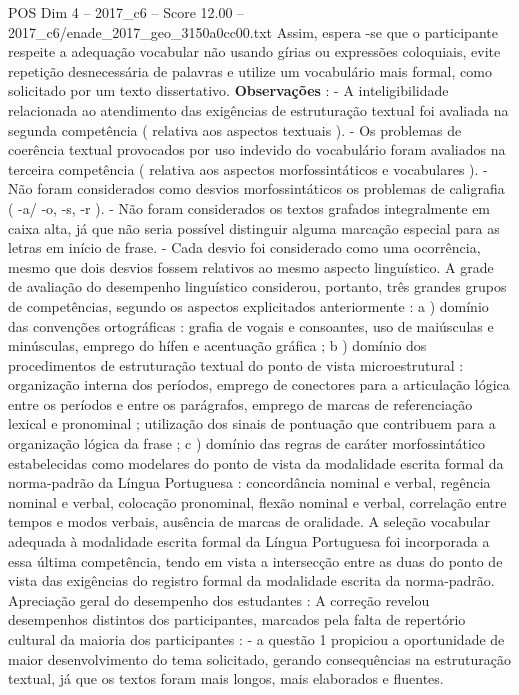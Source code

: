 \begin{textsample}{POS Dim 4 – 2017\_c6 – Score 12.00 – 2017\_c6/enade\_2017\_geo\_3150a0cc00.txt}
Assim, espera -se que o participante respeite a adequação vocabular não usando gírias ou expressões coloquiais, evite repetição desnecessária de palavras e utilize um vocabulário mais formal, como solicitado por um texto dissertativo. \textbf{Observações} : - A inteligibilidade relacionada ao atendimento das exigências de estruturação textual foi avaliada na segunda competência ( relativa aos aspectos textuais ). - Os problemas de coerência textual provocados por uso indevido do vocabulário foram avaliados na terceira competência ( relativa aos aspectos morfossintáticos e vocabulares ). - Não foram considerados como desvios morfossintáticos os problemas de caligrafia ( -a/ -o, -s, -r ). - Não foram considerados os textos grafados integralmente em caixa alta, já que não seria possível distinguir alguma marcação especial para as letras em início de frase. - Cada desvio foi considerado como uma ocorrência, mesmo que dois desvios fossem relativos ao mesmo aspecto linguístico.
A grade de avaliação do desempenho linguístico considerou, portanto, três grandes grupos de competências, segundo os aspectos explicitados anteriormente : a ) domínio das convenções ortográficas : grafia de vogais e consoantes, uso de maiúsculas e minúsculas, emprego do hífen e acentuação gráfica ; b ) domínio dos procedimentos de estruturação textual do ponto de vista microestrutural : organização interna dos períodos, emprego de conectores para a articulação lógica entre os períodos e entre os parágrafos, emprego de marcas de referenciação lexical e pronominal ; utilização dos sinais de pontuação que contribuem para a organização lógica da frase ; c ) domínio das regras de caráter morfossintático estabelecidas como modelares do ponto de vista da modalidade escrita formal da norma-padrão da Língua Portuguesa : concordância nominal e verbal, regência nominal e verbal, colocação pronominal, flexão nominal e verbal, correlação entre tempos e modos verbais, ausência de marcas de oralidade.
A seleção vocabular adequada à modalidade escrita formal da Língua Portuguesa foi incorporada a essa última competência, tendo em vista a intersecção entre as duas do ponto de vista das exigências do registro formal da modalidade escrita da norma-padrão.
Apreciação geral do desempenho dos estudantes : A correção revelou desempenhos distintos dos participantes, marcados pela falta de repertório cultural da maioria dos participantes : - a questão 1 propiciou a oportunidade de maior desenvolvimento do tema solicitado, gerando consequências na estruturação textual, já que os textos foram mais longos, mais elaborados e fluentes.

\end{textsample}
